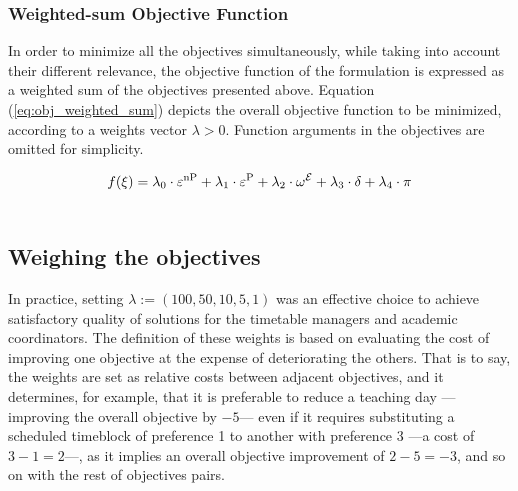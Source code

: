 

\vspace{1em}

\subsubsection{Weighted-sum Objective Function}


    In order to minimize all the objectives simultaneously, while taking into account their different relevance, the objective function of the formulation is expressed as a weighted sum of the objectives presented above.
    Equation (\ref{eq:obj_weighted_sum}) depicts the overall objective function to be minimized, according to a weights vector $\lambda > 0$. Function arguments in the objectives are omitted for simplicity.
    
    \begin{equation}
        \begin{split}
            f(\xi)=\lambda_0 \cdot \varepsilon^\text{nP} + \lambda_1 \cdot \varepsilon^\text{P} + \lambda_2 \cdot \omega^{\mathcal{E}} + \lambda_3 \cdot \delta + \lambda_4 \cdot \pi \\
            \quad 
        \end{split}
        \label{eq:obj_weighted_sum}
    \end{equation}

    \subsection{Weighing the objectives}
    
    In practice, setting $\lambda:=(100,50,10,5,1)$ was an effective choice to achieve satisfactory quality of solutions for the timetable managers and academic coordinators. The definition of these weights is based on evaluating the cost of improving one objective at the expense of deteriorating the others. That is to say, the weights are set as relative costs between adjacent objectives, and it determines, for example, that it is preferable to reduce a teaching day ---improving the overall objective by $-5$--- even if it requires substituting a scheduled timeblock of preference 1 to another with preference 3 ---a cost of $3-1=2$---, as it implies an overall objective improvement of $2-5=-3$, and so on with the rest of objectives pairs.

